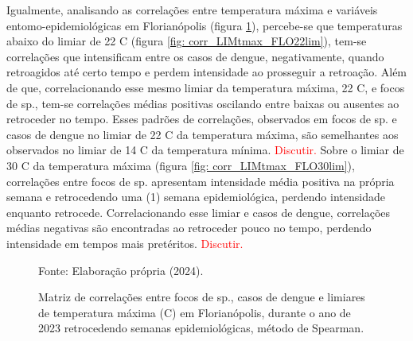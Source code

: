 \documentclass[
	12pt,				%
	openright,			%
	oneside,			%
	a4paper,			%
	english,			%
	french,				%
	spanish,			%
	brazil				%
	dvipsnames, table]{abntex2}
\begin{document}
\indent Igualmente, analisando as correlações entre temperatura máxima e variáveis entomo-epidemiológicas em Florianópolis (figura \ref{fig: matriz_corr_LIMtmax_FLO}), percebe-se que temperaturas abaixo do limiar de 22 C (figura \ref{fig: corr_LIMtmax_FLO22lim}), tem-se correlações que intensificam entre os casos de dengue, negativamente, quando retroagidos até certo tempo e perdem intensidade ao prosseguir a retroação. Além de que, correlacionando esse mesmo limiar da temperatura máxima, 22 C, e focos de  sp., tem-se correlações médias positivas oscilando entre baixas ou ausentes ao retroceder no tempo. Esses padrões de correlações, observados em focos de  sp. e casos de dengue no limiar de 22 C da temperatura máxima, são semelhantes aos observados no limiar de 14 C da temperatura mínima. \textcolor{red}{Discutir.} Sobre o limiar de 30 C da temperatura máxima (figura \ref{fig: corr_LIMtmax_FLO30lim}), correlações entre focos de  sp. apresentam intensidade média positiva na própria semana e retrocedendo uma (1) semana epidemiológica, perdendo intensidade enquanto retrocede. Correlacionando esse limiar e casos de dengue, correlações médias negativas são encontradas ao retroceder pouco no tempo, perdendo intensidade em tempos mais pretéritos. \textcolor{red}{Discutir.}

\begin{figure}[htbp]
    \begin{center}
    \caption{Matriz de correlações entre focos de  sp., casos de dengue e limiares de temperatura máxima (C) em Florianópolis, durante o ano de 2023 retrocedendo semanas epidemiológicas, método de Spearman.}
    \label{fig: matriz_corr_LIMtmax_FLO}
        \hfill
    \end{center}
    \small{Fonte: Elaboração própria (2024).}
\end{figure}
\end{document}
